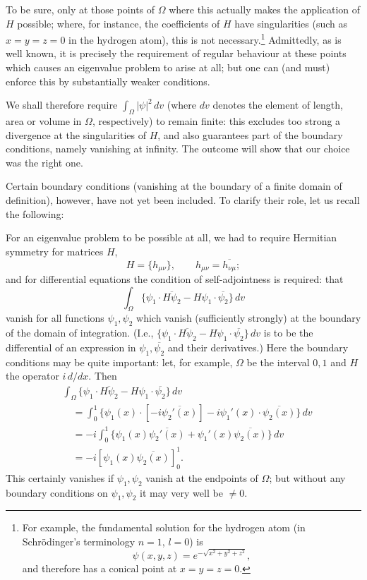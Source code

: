 \documentclass[fontsize=13pt,paper=b5,twoside,bookmarkpackage=false]{scrartcl}
\begin{document}
To be sure, only at those points of $\Omega$ where this actually makes the application of $H$ possible; where, for instance, the coefficients of $H$ have singularities (such as $x=y=z=0$ in the hydrogen atom), this is not necessary.\footnote[13]{\label{fn:13}For example, the fundamental solution for the hydrogen atom (in Schrödinger's terminology $n=1$, $l=0$) is
\[
\psi(x,y,z)=e^{-\sqrt{x^2+y^2+z^2}},
\]
and therefore has a conical point at $x=y=z=0$.} Admittedly, as is well known, it is precisely the requirement of regular behaviour at these points which causes an eigenvalue problem to arise at all; but one can (and must) enforce this by substantially weaker conditions.

We shall therefore require $\int_\Omega|\psi|^2\,dv$ (where $dv$ denotes the element of length, area or volume in $\Omega$, respectively) to remain finite: this excludes too strong a divergence at the singularities of $H$, and also guarantees part of the boundary conditions, namely vanishing at infinity. The outcome will show that our choice was the right one.

Certain boundary conditions (vanishing at the boundary of a finite domain of definition), however, have not yet been included. To clarify their role, let us recall the following:

For an eigenvalue problem to be possible at all, we had to require Hermitian symmetry for matrices $H$,
\[
H=\{h_{\mu\nu}\},\qquad h_{\mu\nu}=\overline{h_{\nu\mu}};
\]
and for differential equations the condition of self-adjointness is required: that
\[
\int_\Omega\{\psi_1\cdot\overline{H\psi_2}-H\psi_1\cdot\overline{\psi_2}\}\,dv
\]
vanish for all functions $\psi_1,\psi_2$ which vanish (sufficiently strongly) at the boundary of the domain of integration. (I.e., $\{\psi_1\cdot\overline{H\psi_2}-H\psi_1\cdot\overline{\psi_2}\}\,dv$ is to be the differential of an expression in $\psi_1,\overline{\psi_2}$ and their derivatives.) Here the boundary conditions may be quite important: let, for example, $\Omega$ be the interval $0,1$ and $H$ the operator $i\,d/dx$. Then
\begin{align*}
&\int_\Omega\{\psi_1\cdot\overline{H\psi_2}-H\psi_1\cdot\overline{\psi_2}\}\,dv\\
&\quad=\int_0^1\{\psi_1(x)\cdot[-i\overline{\psi_2'(x)}]
-i\psi_1'(x)\cdot\overline{\psi_2(x)}\}\,dv\\
&\quad=-i\int_0^1\{\psi_1(x)\overline{\psi_2'(x)}
+\psi_1'(x)\overline{\psi_2(x)}\}\,dv\\
&\quad=-i[\psi_1(x)\overline{\psi_2(x)}]_0^1.
\end{align*}
This certainly vanishes if $\psi_1,\psi_2$ vanish at the endpoints of $\Omega$; but without any boundary conditions on $\psi_1,\psi_2$ it may very well be $\ne0$.
\end{document}

